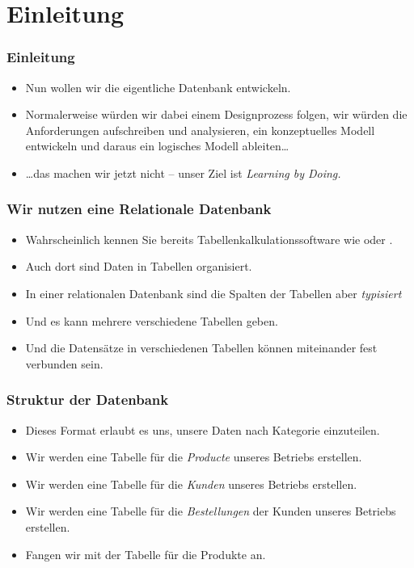 \documentclass[aspectratio=169,mathserif,notheorems]{beamer}%
\subtitle{8.~Fabrik-Datenbank:~Tabelle \emph{product}}%
\begin{document}
%
%
\startPresentation%
%
\section{Einleitung}%
%
\begin{frame}%
\frametitle{Einleitung}%
\begin{itemize}%
\item Nun wollen wir die eigentliche Datenbank entwickeln.%
\item<2-> Normalerweise würden wir dabei einem Designprozess folgen, wir würden die Anforderungen aufschreiben und analysieren, ein konzeptuelles Modell entwickeln und daraus ein logisches Modell ableiten\dots%
\item<3-> {\dots}das machen wir jetzt nicht -- unser Ziel ist \emph{Learning by Doing.}%
\end{itemize}%
\end{frame}%
%
\begin{frame}%
\frametitle{Wir nutzen eine Relationale Datenbank}%
\begin{itemize}%
\item Wahrscheinlich kennen Sie bereits Tabellenkalkulationssoftware wie \microsoftExcel\cite{P2020MSS2ABG,A2024TSAFMSS2,W2018MSSDB} oder \libreofficeCalc\cite{DF2024LTDF,GL2012LTSOOSSCBAFACSOL,S2022L7PFEUU}.%
\item<2-> Auch dort sind Daten in Tabellen organisiert.%
\item<3-> In einer relationalen Datenbank sind die Spalten der Tabellen aber \emph{typisiert}%
\item<5-> Und es kann mehrere verschiedene Tabellen geben.%
\item<6-> Und die Datensätze in verschiedenen Tabellen können miteinander fest verbunden sein.%
\end{itemize}%
\end{frame}%
%
\begin{frame}%
\frametitle{Struktur der Datenbank}%
\begin{itemize}%
\item Dieses Format erlaubt es uns, unsere Daten nach Kategorie einzuteilen.%
\item<2-> Wir werden eine Tabelle für die \emph{Producte} unseres Betriebs erstellen.%
\item<3-> Wir werden eine Tabelle für die \emph{Kunden} unseres Betriebs erstellen.%
\item<4-> Wir werden eine Tabelle für die \emph{Bestellungen} der Kunden unseres Betriebs erstellen.%
\item<5-> Fangen wir mit der Tabelle für die Produkte an.%
\end{itemize}%
\end{frame}%
%
\end{document}
